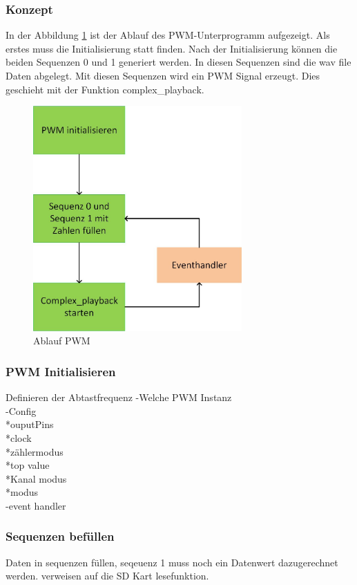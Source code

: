 \subsubsection{Konzept}\label{sec:Konzept}
In der Abbildung \ref{fig:pwm_ablauf} ist der Ablauf des PWM-Unterprogramm aufgezeigt. Als erstes muss die Initialisierung statt finden. Nach der Initialisierung können die beiden Sequenzen 0 und 1 generiert werden. In diesen Sequenzen sind die wav file Daten abgelegt. Mit diesen Sequenzen wird ein PWM Signal erzeugt. Dies geschieht mit der Funktion complex\_playback.

\begin{figure}[H]
	\begin{center}
		\includegraphics[width=80mm]{data/pwm_ablauf.jpg}
		\caption[Ablauf PWM]{Ablauf PWM} %
		\label{fig:pwm_ablauf}
	\end{center}
\end{figure}

\subsubsection*{PWM Initialisieren}\label{sec:PWM initialisieren}
Definieren der Abtastfrequenz
-Welche PWM Instanz\\
-Config\\
	*ouputPins\\
	*clock\\
	*zählermodus\\
	*top value\\
	*Kanal modus\\
	*modus\\
-event handler

\subsubsection*{Sequenzen befüllen}\label{sec:Sequenzen befüllen}
Daten in sequenzen füllen, seqeuenz 1 muss noch ein Datenwert dazugerechnet werden. verweisen auf die SD Kart lesefunktion.

